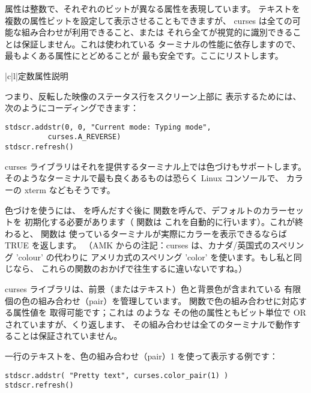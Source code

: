 \documentclass{howto}
\begin{document}
属性は整数で、それぞれのビットが異なる属性を表現しています。
テキストを複数の属性ビットを設定して表示させることもできますが、
curses は全ての可能な組み合わせが利用できること、または
それら全てが視覚的に識別できることは保証しません。これは使われている
ターミナルの性能に依存しますので、最もよくある属性にとどめることが
最も安全です。ここにリストします。

\begin{tableii}{|c|l|}{定数}{属性}{説明}
\end{tableii}

つまり、反転した映像のステータス行をスクリーン上部に
表示するためには、
次のようにコーディングできます：

\begin{verbatim}
stdscr.addstr(0, 0, "Current mode: Typing mode",
	      curses.A_REVERSE)
stdscr.refresh()
\end{verbatim}

curses ライブラリはそれを提供するターミナル上では色づけもサポートします。
そのようなターミナルで最も良くあるものは恐らく Linux コンソールで、
カラーの xterm などもそうです。

色づけを使うには、 を呼んだすぐ後に
 関数を呼んで、デフォルトのカラーセットを
初期化する必要があります（ 関数は
これを自動的に行います）。これが終わると、 関数は
使っているターミナルが実際にカラーを表示できるならば TRUE を返します。
（AMK からの注記：curses は、カナダ/英国式のスペリング 'colour' の代わりに
アメリカ式のスペリング 'color' を使います。もし私と同じなら、
これらの関数のおかげで往生するに違いないですね。）

curses ライブラリは、前景（またはテキスト）色と背景色が含まれている
有限個の色の組み合わせ（pair）を管理しています。
 関数で色の組み合わせに対応する属性値を
取得可能です；これは  のような
その他の属性ともビット単位で OR されていますが、くり返します、
その組み合わせは全てのターミナルで動作することは保証されていません。

一行のテキストを、色の組み合わせ（pair）1 を使って表示する例です：

\begin{verbatim}
stdscr.addstr( "Pretty text", curses.color_pair(1) )
stdscr.refresh()
\end{verbatim}
\end{document}
